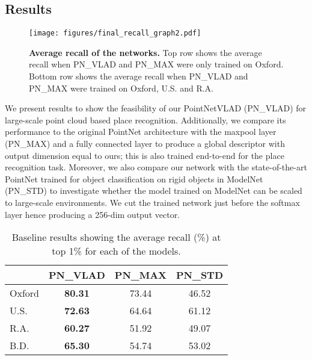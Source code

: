 \documentclass[10pt,twocolumn,letterpaper]{article}
\begin{document}
\subsection{Results}
\begin{figure*}[t]
	\begin{center}
\texttt{[image: figures/final\_recall\_graph2.pdf]}
	\end{center}
	\vspace{-0.4cm}
	\caption{\textbf{Average recall of the networks.} Top row shows the average recall when PN\_VLAD and PN\_MAX were only trained on Oxford. Bottom row shows the average recall when PN\_VLAD and PN\_MAX were trained on Oxford, U.S. and R.A. \vspace{-0.4cm}}
	\label{fig:results_recall}
\end{figure*}

We present results to show the feasibility of our PointNetVLAD (PN\_VLAD) for large-scale point cloud based place recognition. Additionally, we compare its performance to the original PointNet architecture with the maxpool layer (PN\_MAX) and a fully connected layer to produce a global descriptor with output dimension equal to ours; this is also trained end-to-end for the place recognition task. Moreover, we also compare our network with the state-of-the-art PointNet trained for object classification on rigid objects in ModelNet (PN\_STD) to investigate whether the model trained on ModelNet can be scaled to large-scale environments. We cut the trained network just before the softmax layer hence producing a 256-dim output vector. 
\newline
\begin{table}
	\begin{center}
		\begin{tabular}{|l|c|c|c|}
			\hline
			& PN\_VLAD & PN\_MAX & PN\_STD\\
			\hline
			Oxford& \textbf{80.31} & 73.44 & 46.52  \\
			\hline
			U.S.& \textbf{72.63} & 64.64 & 61.12 \\
			\hline
			R.A.& \textbf{60.27} & 51.92 & 49.07 \\
			\hline
			B.D.& \textbf{65.30} & 54.74 & 53.02\\
			\hline			
		\end{tabular}
	\end{center}
	\vspace{-0.2cm}
	\caption{Baseline results showing the average recall (\%) at top 1\% for each of the models.\vspace{-0.2cm}}
	\label{tab:baseline}
\end{table}
\end{document}
